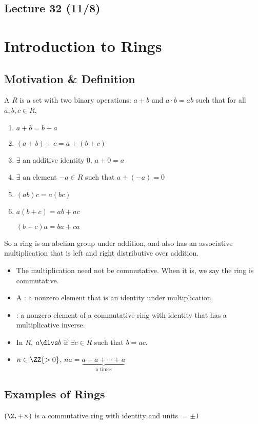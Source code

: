 \subsection*{Lecture 32 (11/8)} %
\section{Introduction to Rings}
\subsection{Motivation \& Definition}
\begin{definition}[Ring]
  A  \(R\) is a set with two binary operations: \(a+b\) and \(a\cdot b=ab\) such that for all \(a,b,c\in R\),
  \begin{enumerate}
    \item \(a+b = b+a\)
    \item \((a+b)+c = a+(b+c)\)
    \item \(\exists\) an additive identity \(0\), \(a+0 = a\)
    \item \(\exists\) an element \(-a\in R\) such that \(a+(-a)=0\)
    \item \((ab)c = a(bc)\)
    \item \(a(b+c) = ab+ac\)

    \((b+c)a = ba+ca\)
  \end{enumerate}
\end{definition}

So a ring is an abelian group under addition, and also has an associative multiplication that is left and right distributive over addition.
\begin{itemize}
  \item The multiplication need not be commutative. When it is, we say the ring is commutative.
  \item A : a nonzero element that is an identity under multiplication.
  \item {}: a nonzero element of a commutative ring with identity that has a multiplicative inverse.
  \item In \(R\), \(a\divs b\) if \(\exists c\in R\) such that \(b=ac\).
  \item \(n\in \ZZ{>0}\), \(na = \underbrace{a+a+\cdots+a}_{\text{n times}}\)
\end{itemize}

\subsection{Examples of Rings}
\begin{example}
  \((\Z, +\times)\) is a commutative ring with identity and units \(=\pm 1\)
\end{example}

